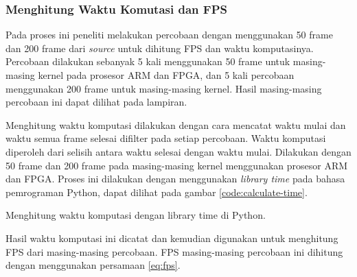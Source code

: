 \subsubsection{Menghitung Waktu Komutasi dan FPS}
Pada proses ini peneliti melakukan percobaan dengan menggunakan 50 frame dan 200 frame dari \textit{source} untuk dihitung FPS dan waktu komputasinya. Percobaan dilakukan sebanyak 5 kali menggunakan 50 frame untuk masing-masing kernel pada prosesor ARM dan FPGA, dan 5 kali percobaan menggunakan 200 frame untuk masing-masing kernel. Hasil masing-masing percobaan ini dapat dilihat pada lampiran.

Menghitung waktu komputasi dilakukan dengan cara mencatat waktu mulai dan waktu semua frame selesai difilter pada setiap percobaan. Waktu komputasi diperoleh dari selisih antara waktu selesai dengan waktu mulai. Dilakukan dengan 50 frame dan 200 frame pada masing-masing kernel menggunakan prosesor ARM dan FPGA. Proses ini dilakukan dengan menggunakan \textit{library time} pada bahasa pemrograman Python, dapat dilihat pada gambar \ref{code:calculate-time}.
\begin{afigure}
    
    \caption{Menghitung waktu komputasi dengan library time di Python.}
    \label{code:calculate-time}
\end{afigure}

Hasil waktu komputasi ini dicatat dan kemudian digunakan untuk menghitung FPS dari masing-masing percobaan. FPS masing-masing percobaan ini dihitung dengan menggunakan persamaan \ref{eq:fps}.


